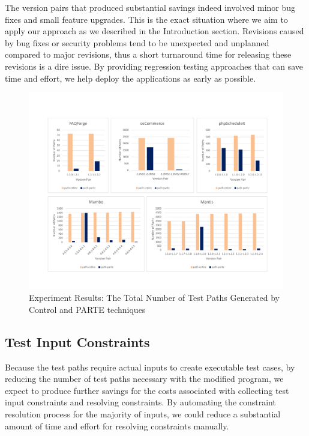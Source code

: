 The version pairs that produced substantial savings indeed involved
minor bug fixes and small feature upgrades. 
This is the exact situation where we aim to apply our approach
as we described in the Introduction section. 
Revisions caused by bug fixes or security problems tend to be unexpected 
and unplanned compared to major revisions, thus a short turnaround time 
for releasing these revisions is a dire issue. By providing regression testing 
approaches that can save time and effort, we help deploy the applications
as early as possible.

\begin{figure}[ht]
\centering
\includegraphics[width=1.0\columnwidth]{figures/bargraph.pdf}
\vspace*{-15pt}
\caption{Experiment Results: The Total Number of Test Paths
Generated by Control and PARTE techniques}
\vspace*{5pt}
\label{fig:bargraph}
\vspace*{5pt}
\end{figure}

\subsection{Test Input Constraints}

Because the test paths require actual inputs to create executable
test cases, by reducing the number of test paths necessary with the
modified program, we expect to produce further savings for the costs
associated with collecting test input constraints and resolving
constraints.
By automating the constraint resolution process for the majority
of inputs, we could reduce a substantial amount of time and effort
for resolving constraints manually.

